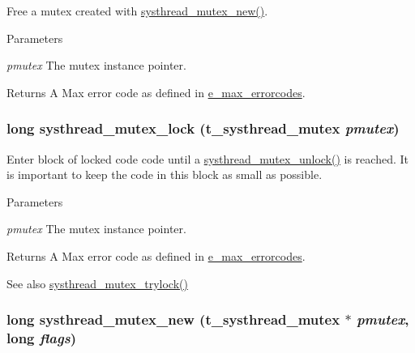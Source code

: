 Free a mutex created with \hyperlink{group__mutex_gaa8cae78764c59883566ac4f861dd534e}{systhread\_\-mutex\_\-new()}. 
\begin{DoxyParams}{Parameters}
\item[{\em pmutex}]The mutex instance pointer. \end{DoxyParams}
\begin{DoxyReturn}{Returns}
A Max error code as defined in \hyperlink{group__misc_ga0764dd6c02b76cca7d053ae50555d69d}{e\_\-max\_\-errorcodes}. 
\end{DoxyReturn}
\hypertarget{group__mutex_ga6a3bea4c2f5e5d133d25d78b51fb15bf}{
\subsubsection[{systhread\_\-mutex\_\-lock}]{\setlength{\rightskip}{0pt plus 5cm}long systhread\_\-mutex\_\-lock ({\bf t\_\-systhread\_\-mutex} {\em pmutex})}}
\label{group__mutex_ga6a3bea4c2f5e5d133d25d78b51fb15bf}


Enter block of locked code code until a \hyperlink{group__mutex_ga74aae707e650844be8a4e51a217c9b5f}{systhread\_\-mutex\_\-unlock()} is reached. It is important to keep the code in this block as small as possible.


\begin{DoxyParams}{Parameters}
\item[{\em pmutex}]The mutex instance pointer. \end{DoxyParams}
\begin{DoxyReturn}{Returns}
A Max error code as defined in \hyperlink{group__misc_ga0764dd6c02b76cca7d053ae50555d69d}{e\_\-max\_\-errorcodes}. 
\end{DoxyReturn}
\begin{DoxySeeAlso}{See also}
\hyperlink{group__mutex_gafa0cef91ad29e8e0625d35eadde52002}{systhread\_\-mutex\_\-trylock()} 
\end{DoxySeeAlso}
\hypertarget{group__mutex_gaa8cae78764c59883566ac4f861dd534e}{
\subsubsection[{systhread\_\-mutex\_\-new}]{\setlength{\rightskip}{0pt plus 5cm}long systhread\_\-mutex\_\-new ({\bf t\_\-systhread\_\-mutex} $\ast$ {\em pmutex}, \/  long {\em flags})}}
\label{group__mutex_gaa8cae78764c59883566ac4f861dd534e}


